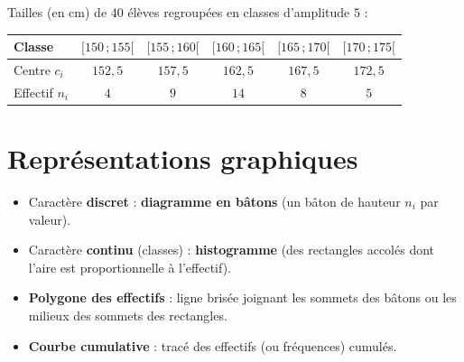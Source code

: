 \begin{exemple}
Tailles (en cm) de $40$ élèves regroupées en classes d'amplitude $5$ :
\begin{center}\renewcommand{\arraystretch}{1.25}
\begin{tabular}{@{}l c c c c c@{}}
\toprule
Classe & $[150\,;155[$ & $[155\,;160[$ & $[160\,;165[$ & $[165\,;170[$ & $[170\,;175[$ \\
\midrule
Centre $c_i$ & $152{,}5$ & $157{,}5$ & $162{,}5$ & $167{,}5$ & $172{,}5$ \\
Effectif $n_i$ & $4$ & $9$ & $14$ & $8$ & $5$ \\
\bottomrule
\end{tabular}
\end{center}
\end{exemple}

\section{Représentations graphiques}

\begin{aretenir}
\begin{itemize}
  \item Caractère \textbf{discret} : \textbf{diagramme en bâtons} (un bâton de
        hauteur $n_i$ par valeur).
  \item Caractère \textbf{continu} (classes) : \textbf{histogramme} (des rectangles
        accolés dont l'aire est proportionnelle à l'effectif).
  \item \textbf{Polygone des effectifs} : ligne brisée joignant les sommets des
        bâtons ou les milieux des sommets des rectangles.
  \item \textbf{Courbe cumulative} : tracé des effectifs (ou fréquences) cumulés.
\end{itemize}
\end{aretenir}

\begin{illus}
\end{illus}

